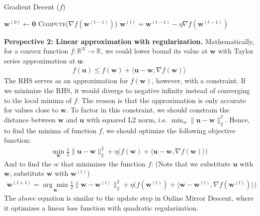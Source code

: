 \documentclass[11pt]{article}
\newcommand{\bw}{\boldsymbol{w}}
\newcommand{\bu}{\boldsymbol{u}}
\begin{document}
\begin{algorithm}[H]
\caption{Gradient Decent ($f$)}
\label{algo:gd}
\begin{algorithmic}[1]
\STATE $\bw^{(0)} \leftarrow \boldsymbol{0}$
\STATE \textsc{Compute}($\nabla f(\bw^{(t-1)})$)
\STATE $\bw^{(t)} = \bw^{(t-1)} - \eta \nabla f(\bw^{(t-1)})$
\ENDFOR
\end{algorithmic}
\end{algorithm}

\textbf{Perspective 2: Linear approximation with regularization.}
Mathematically, for a convex function $f:\mathbb{R}^N \rightarrow \mathbb{R}$, we could lower bound its value at $\bw$ with Taylor series approximation at $\bu$:
%
\begin{equation*}
\begin{split}
f(\bu) \leq f(\bw) + \langle \bu-\bw, \nabla f(\bw) \rangle
\end{split}
\end{equation*}
%
The RHS serves as an approximation for $f(\bw)$, however, with a constraint. If we minimize the RHS, it would diverge to negative infinity instead of converging to the local minima of $f$. The reason is that the approximation is only accurate for values close to $\bw$.
To factor in this constraint, we should constrain the distance between $\bw$ and $\bu$ with squared L2 norm, i.e. $\min_w \| \bu - \bw \|_2^2$. Hence, to find the minima of function $f$, we should optimize the following objective function: 
%
\begin{equation*}
\begin{split}
\min_{\bw} \frac{1}{2} \| \bu - \bw \|_2^2 
+ \eta\Big(f(\bw) + \langle \bu-\bw, \nabla f(\bw) \rangle \Big)
\end{split}
\end{equation*}
%
And to find the $w$ that minimizes the function $f$: (Note that we substitute $\bu$ with $\bw$, substitute $\bw$ with $\bw^{(t)}$)
%
\begin{equation*}
\begin{split}
\bw^{(t+1)} = 
\underset{\bw}{\arg\min} \frac{1}{2} \| \bw - \bw^{(t)} \|_2^2 
+ \eta\Big(f(\bw^{(t)}) + \langle \bw-\bw^{(t)}, \nabla f(\bw^{(t)}) \rangle \Big)
\end{split}
\end{equation*}
%
The above equation is similar to the update step in Online Mirror Descent, where it optimizes a linear loss function with quadratic regularization.
\end{document}
